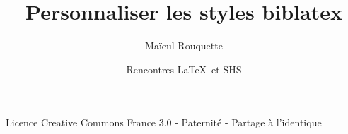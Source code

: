 \documentclass{beamer}
\author{Maïeul Rouquette}
\date{Rencontres \LaTeX\ et SHS}
\title{Personnaliser les styles biblatex}
\institute{Université de Lausanne --- IRSB}
\begin{document}
\begin{frame}
	\titlepage
	\vfill
	{\tiny Licence Creative Commons France 3.0 - Paternité - Partage à l'identique}
\end{frame}
\end{document}
